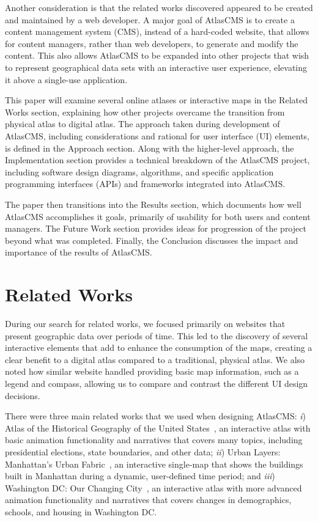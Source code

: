 \documentclass[11pt, draftcls, conference, onecolumn]{IEEEtran}
\begin{document}
Another consideration is that the related works discovered appeared to be created and maintained by a web developer. A major goal of AtlasCMS is to create a content management system (CMS), instead of a hard-coded website, that allows for content managers, rather than web developers, to generate and modify the content. This also allows AtlasCMS to be expanded into other projects that wish to represent geographical data sets with an interactive user experience, elevating it above a single-use application.

This paper will examine several online atlases or interactive maps in the Related Works section, explaining how other projects overcame the transition from physical atlas to digital atlas. The approach taken during development of AtlasCMS, including considerations and rational for user interface (UI) elements, is defined in the Approach section. Along with the higher-level approach, the Implementation section provides a technical breakdown of the AtlasCMS project, including software design diagrams, algorithms, and specific application programming interfaces (APIs) and frameworks integrated into AtlasCMS.

The paper then transitions into the Results section, which documents how well AtlasCMS accomplishes it goals, primarily of usability for both users and content managers. The Future Work section provides ideas for progression of the project beyond what was completed. Finally, the Conclusion discusses the impact and importance of the results of AtlasCMS.

\section{Related Works}
During our search for related works, we focused primarily on websites that present geographic data over periods of time. This led to the discovery of several interactive elements that add to enhance the consumption of the maps, creating a clear benefit to a digital atlas compared to a traditional, physical atlas. We also noted how similar website handled providing basic map information, such as a legend and compass, allowing us to compare and contrast the different UI design decisions.

There were three main related works that we used when designing AtlasCMS: {\it i}) Atlas of the Historical Geography of the United States~\cite{us-historical-atlas-2014}, an interactive atlas with basic animation functionality and narratives that covers many topics, including presidential elections, state boundaries, and other data; {\it ii}) Urban Layers: Manhattan's Urban Fabric~\cite{urban-layers-2014}, an interactive single-map that shows the buildings built in Manhattan during a dynamic, user-defined time period; and {\it iii}) Washington DC: Our Changing City~\cite{dc-changing-2014}, an interactive atlas with more advanced animation functionality and narratives that covers changes in demographics, schools, and housing in Washington DC.
\end{document}

